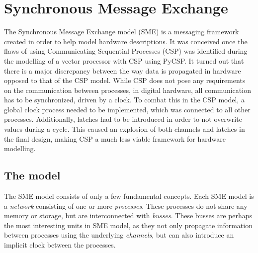 \section{Synchronous Message Exchange}
The Synchronous Message Exchange
model (SME) is a messaging framework created in order to help model
hardware descriptions\cite{sme_for_hardware_designs}.  It was conceived
once the flaws of using Communicating Sequential Processes (CSP) was
identified during the modelling of a vector processor with CSP using
PyCSP\cite{PyCSP}.  It turned out that there is a major discrepancy
between the way data is propagated in hardware opposed to that of the
CSP model. While CSP does not pose any requirements on the communication
between processes, in digital hardware, all communication has to be
synchronized, driven by a clock. To combat this in the CSP model, a
global clock process needed to be implemented, which was connected to
all other processes. Additionally, latches had to be introduced in order
to not overwrite values during a cycle. This caused an explosion of both
channels and latches in the final design, making CSP a much less viable
framework for hardware modelling\cite{sme_for_hardware_designs}.

\subsection{The model} The SME model consists of only a few fundamental
concepts. Each SME model is a \textit{network} consisting of one or more
\textit{processes}. These processes do not share any memory or storage,
but are interconnected with \textit{busses}.  These busses are perhaps
the most interesting units in SME model, as they not only propagate
information between processes using the underlying \textit{channels},
but can also introduce an implicit clock between the processes.\\

